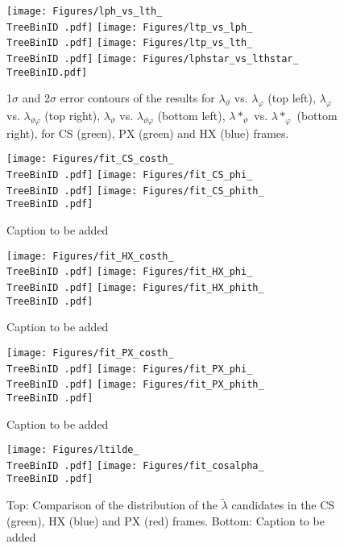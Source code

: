 \documentclass[12pt]{article}
\newcommand{\lamth}{\lambda_\vartheta}
\newcommand{\lamph}{\lambda_\varphi}
\newcommand{\lamthph}{\lambda_{\vartheta\varphi}}
\newcommand{\lamtilde}{\tilde{\lambda}}
\newcommand{\lamthstar}{\lambda*_\vartheta}
\newcommand{\lamphstar}{\lambda*_\varphi}
\providecommand{\TreeBinID}[1]{TreeBinIDDefault_rap1pt1}%
\begin{document}




\begin{figure}[htbp]
\centering
\texttt{[image: Figures/lph\_vs\_lth\_\\TreeBinID .pdf]}
\texttt{[image: Figures/ltp\_vs\_lph\_\\TreeBinID .pdf]}
\texttt{[image: Figures/ltp\_vs\_lth\_\\TreeBinID .pdf]}
\texttt{[image: Figures/lphstar\_vs\_lthstar\_\\TreeBinID.pdf]}
\caption{1$\sigma$ and 2$\sigma$ error contours of the results for $\lamth$
vs. $\lamph$ (top left), $\lamph$ vs. $\lamthph$ (top right), $\lamth$ vs.
$\lamthph$ (bottom left), $\lamthstar$ vs. $\lamphstar$ (bottom right), for CS
(green), PX (green) and HX (blue) frames.}
\end{figure}
\clearpage




\begin{figure}[htbp]
\centering
\texttt{[image: Figures/fit\_CS\_costh\_\\TreeBinID .pdf]}
\texttt{[image: Figures/fit\_CS\_phi\_\\TreeBinID .pdf]}
\texttt{[image: Figures/fit\_CS\_phith\_\\TreeBinID .pdf]}
\caption{Caption to be added}
\end{figure}
\clearpage

\begin{figure}[htbp]
\centering
\texttt{[image: Figures/fit\_HX\_costh\_\\TreeBinID .pdf]}
\texttt{[image: Figures/fit\_HX\_phi\_\\TreeBinID .pdf]}
\texttt{[image: Figures/fit\_HX\_phith\_\\TreeBinID .pdf]}
\caption{Caption to be added}
\end{figure}
\clearpage

\begin{figure}[htbp]
\centering
\texttt{[image: Figures/fit\_PX\_costh\_\\TreeBinID .pdf]}
\texttt{[image: Figures/fit\_PX\_phi\_\\TreeBinID .pdf]}
\texttt{[image: Figures/fit\_PX\_phith\_\\TreeBinID .pdf]}
\caption{Caption to be added}
\end{figure}
\clearpage

\begin{figure}[htbp]
\centering
\texttt{[image: Figures/ltilde\_\\TreeBinID .pdf]}
\texttt{[image: Figures/fit\_cosalpha\_\\TreeBinID .pdf]}
\caption{Top: Comparison of the distribution of the $\lamtilde$ candidates in
the CS (green), HX (blue) and PX (red) frames. Bottom: Caption to be added}
\end{figure}
\clearpage
\end{document}

